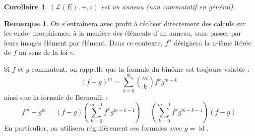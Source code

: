 \documentclass[french]{book}
\theoremstyle{plain}
\newtheorem{cor}{Corollaire}[chapter]
\theoremstyle{definition}
\newtheorem{rmq}{Remarque}[chapter]
\theoremstyle{remark}
\DeclareMathOperator{\id}{id}
\begin{document}
\begin{cor}
	$(\mathcal{L}(E), +, \circ)$ est un anneau (non commutatif en général).
\end{cor}
\begin{rmq}
	On s'entraînera avec profit à réaliser directement des calculs sur les endo- morphismes, à la manière des éléments d'un anneau, sans passer par leurs images élément par élément. Dans ce contexte, $f^n$ désignera la n-ième itérée de $f$ au sens de la loi $\circ$. \\ \par Si $f$ et $g$ commutent, on rappelle que la formule du binôme est toujours valable :$$(f+g)^m = \sum_{k=0}^m \binom{m}{k} f^k g^{m-k}$$ ainsi que la formule de Bernoulli :$$f^m - g^m = (f-g)(\sum_{k=0}^{m-1} f^k g^{m-k-1}) = (\sum_{k=0}^{m-1} f^k g^{m-k-1})(f-g)$$ En particulier, on utilisera régulièrement ces formules avec $g = \id$.
\end{rmq}
\end{document}
